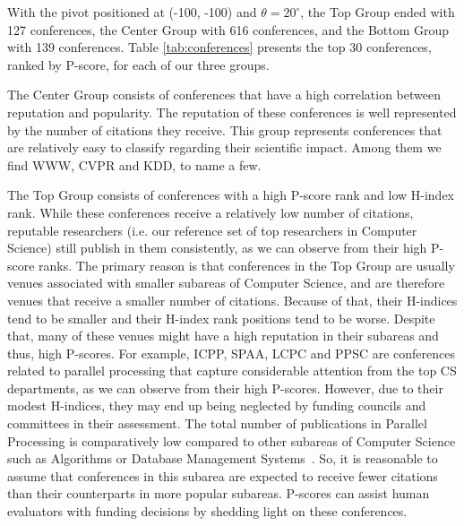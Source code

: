 \documentclass[notitlepage]{svjour3}
\begin{document}
With the pivot positioned at (-100, -100) and $ \theta=20^{\circ} $, the Top Group ended with 127 conferences, the 
Center Group with 616 conferences, and the Bottom Group with 139 conferences. Table 
\ref{tab:conferences} presents the top 30 conferences, ranked by P-score, for each of our three groups.

The Center Group consists of conferences that have a high correlation between reputation and
popularity. The reputation of these conferences is well represented by the number of citations
they receive. This group represents conferences that are relatively easy to classify regarding
their scientific impact. Among them we find WWW, CVPR and KDD, to name a few.

The Top Group consists of conferences with a high P-score rank and low H-index rank. While these conferences
receive a relatively low number of citations, reputable researchers (i.e. our reference set of top researchers in Computer Science) still publish 
in them consistently, as we can observe from their high P-score ranks. The primary reason is that
conferences in the Top Group are usually venues associated with smaller subareas of Computer Science, and are therefore venues that receive a smaller
number of citations. Because of that, their H-indices tend to be smaller and their H-index rank positions tend to be worse. Despite that, many of these venues might have a high reputation in their subareas and thus, high P-scores. 
For example, ICPP, SPAA, LCPC and PPSC are conferences related to parallel processing that capture
considerable attention from the top CS departments, as we can observe from their high P-scores. However,
due to their modest H-indices, they may end up being neglected by funding councils and committees in
their assessment. The total number of publications in Parallel Processing is comparatively low 
compared to other subareas of Computer Science such as Algorithms or Database Management Systems~\cite{Hoonlor2013}. So, it is reasonable to assume that conferences 
in this subarea are expected to receive fewer citations than their counterparts in more popular subareas.
P-scores can assist human evaluators with funding decisions by shedding light on these conferences.
\end{document}
